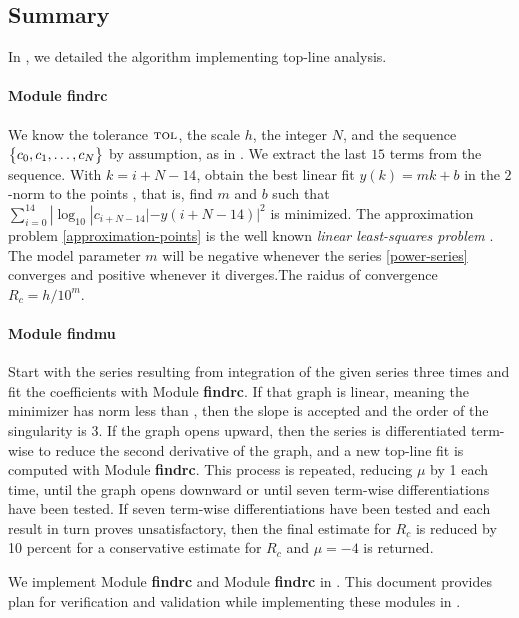 \documentclass[12pt, titlepage]{article}
\begin{document}
\subsection{Summary}

In \cite{SRS}, we detailed the algorithm implementing top-line analysis.

\paragraph{Module findrc} \label{findrc}
We know the tolerance $\text{\sc tol}$, the scale $h$, the integer $N$, and the sequence
$\bigl\{ {c_0, c_1, \ldots, c_{N}} \bigr\}$ by assumption, as in .
We extract the last $15$ terms from the sequence.
With $k = i+N-14$, obtain the best linear fit $y(k) = m k + b$ in the $2$-norm to the points
\EQ
{
  \label{eq:approximation-points}
  ,
}
that is, find $m$ and $b$ such that $\sum_{i=0}^{14} |\log_{10} |c_{i+N-14}| - y(i+N-14)|^2$ is minimized.
The approximation problem \eqref{approximation-points} is the well known
{\it linear least-squares problem} \cite{GoVL89}.
The model parameter $m$ will be negative whenever the series \eqref{power-series} converges and
positive whenever it diverges.The raidus of convergence $R_c = h/10^m$.

\paragraph{Module findmu}
Start with the series resulting from integration of the given series three times and
fit the coefficients with Module {\bf findrc}. If that graph is linear, meaning the
minimizer has norm less than \tol, then the slope is accepted and the order of the
singularity is 3. If the graph opens upward, then the series is differentiated term-wise
to reduce the second derivative of the graph, and a new top-line fit is computed with
Module {\bf findrc}. This process is repeated, reducing $\mu$ by 1 each time, until the
graph opens downward or until seven term-wise differentiations have been tested.
If seven term-wise differentiations have been tested and each result in turn proves
unsatisfactory, then the final estimate for $R_c$ is reduced by 10 percent for a
conservative estimate for $R_c$ and $\mu=-4$ is returned.

We implement Module {\bf findrc} and Module {\bf findrc} in .
This document provides plan for verification and validation  while implementing
these modules in \cpp.
\end{document}
